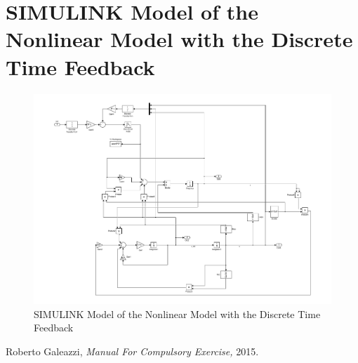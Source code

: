 \documentclass[11pt,a4paper,fleqn, onesside]{report}
\begin{document}
\chapter{SIMULINK Model of the Nonlinear Model with the Discrete Time Feedback}
\label{AppP17}
\begin{figure}[H]
 \centering 
 \includegraphics[trim=1cm 0cm 2cm 0cm, clip=true, totalheight=0.35\textheight, angle=0]{figures/modelp17.pdf}
 \caption{SIMULINK Model of the Nonlinear Model with the Discrete Time Feedback}
\label{fig:modelp17}
\end{figure}


  \begin{thebibliography}{1}
	 Roberto Galeazzi, {\em Manual For Compulsory Exercise,}  2015.
  \end{thebibliography}
\end{document}
